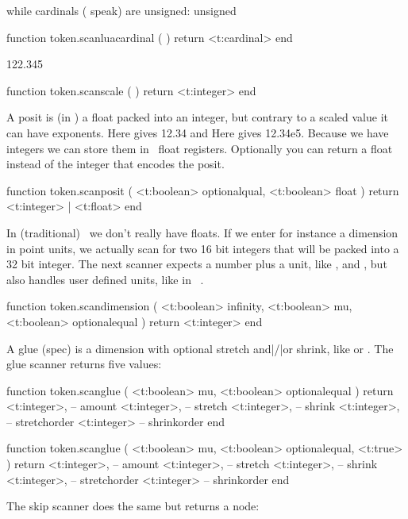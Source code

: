 while cardinals ( speak) are unsigned:
unsigned

\starttyping[option=LUA]
function token.scanluacardinal ( )
    return <t:cardinal>
end
\stoptyping

 122.345

\starttyping[option=LUA]
function token.scanscale ( )
    return <t:integer>
end
\stoptyping

A posit is (in \LUAMETATEX) a float packed into an integer, but contrary to a
scaled value it can have exponents. Here  gives {\tttf
{} 12.34} and Here  gives {\tttf
{}12.34e5}. Because we have integers we can store
them in \LUAMETATEX\ float registers. Optionally you can return a float instead
of the integer that encodes the posit.

\starttyping[option=LUA]
function token.scanposit (
    <t:boolean> optionalqual,
    <t:boolean> float
)
    return <t:integer> | <t:float>
end
\stoptyping

In (traditional) \TEX\ we don't really have floats. If we enter for instance a
dimension in point units, we actually scan for two 16 bit integers that will be
packed into a 32 bit integer. The next scanner expects a number plus a unit, like
,  and , but also handles user defined units, like
in \CONTEXT\ .

\starttyping[option=LUA]
function token.scandimension (
    <t:boolean> infinity,
    <t:boolean> mu,
    <t:boolean> optionalequal
)
    return <t:integer>
end
\stoptyping

A glue (spec) is a dimension with optional stretch and|/|or shrink, like  or . The glue scanner returns five values:

\starttyping[option=LUA]
function token.scanglue (
    <t:boolean> mu,
    <t:boolean> optionalequal
)
    return
        <t:integer>, -- amount
        <t:integer>, -- stretch
        <t:integer>, -- shrink
        <t:integer>, -- stretchorder
        <t:integer>  -- shrinkorder
end

function token.scanglue (
    <t:boolean> mu,
    <t:boolean> optionalequal,
    <t:true>
)
    return {
        <t:integer>, -- amount
        <t:integer>, -- stretch
        <t:integer>, -- shrink
        <t:integer>, -- stretchorder
        <t:integer>  -- shrinkorder
    }
end
\stoptyping

The skip scanner does the same but returns a  node:

